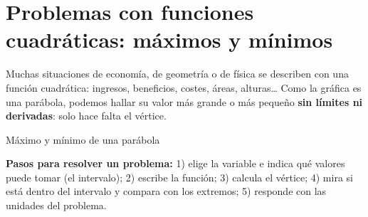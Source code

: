 \documentclass[11pt,a4paper]{article}
\makeatletter
\newcommand{\lt}{<}\newcommand{\gt}{>}
\newcommand{\fmm}[1]{\setbox0=\hbox{$#1$}\ifdim\wd0>0.8\linewidth\def\fmmnext{\fmmdisp{#1}}\else\def\fmmnext{\mbox{\box0}}\fi\fmmnext}
\def\fmmdisp#1{\@ifnextchar.{\fmmdispp{#1}}{\@ifnextchar,{\fmmdispc{#1}}{\@ifnextchar;{\fmmdisps{#1}}{\fmdisp{#1}}}}}
\def\fmmdispp#1.{\fmdisp{#1\,.}}\def\fmmdispc#1,{\fmdisp{#1\,,}}\def\fmmdisps#1;{\fmdisp{#1\,;}}
\newcommand{\fmdisp}[1]{\[\setbox2=\hbox{$\displaystyle #1$}\ifdim\wd2>\linewidth\resizebox{\linewidth}{!}{\box2}\else\box2\fi\]}
\makeatother
\begin{document}
\Needspace{6.2cm}
\section{Problemas con funciones cuadráticas: máximos y mínimos}\hypertarget{sec8}{}

Muchas situaciones de economía, de geometría o de física se describen con una función cuadrática: ingresos, beneficios, costes, áreas, alturas\dots{} Como la gráfica es una parábola, podemos hallar su valor más grande o más pequeño \textbf{sin límites ni derivadas}: solo hace falta el vértice.

\begin{fmdef}{Máximo y mínimo de una parábola}

\textbf{Pasos para resolver un problema:} 1) elige la variable e indica qué valores puede tomar (el intervalo); 2) escribe la función; 3) calcula el vértice; 4) mira si está dentro del intervalo y compara con los extremos; 5) responde con las unidades del problema.
\end{fmdef}
\end{document}
